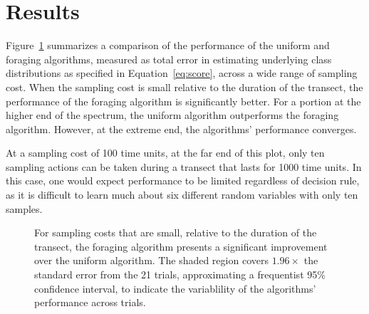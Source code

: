 \section{Results}
\label{sec:results}




% 

% 

Figure~\ref{fig:err} summarizes a comparison of the performance of the uniform and foraging algorithms, measured as total error in estimating underlying class distributions as specified in Equation~\ref{eq:score}, across a wide range of sampling cost.
When the sampling cost is small relative to the duration of the transect, the performance of the foraging algorithm is significantly better.  For a portion at the higher end of the spectrum, the uniform algorithm outperforms the foraging algorithm.  However, at the extreme end, the algorithms' performance converges.

At a sampling cost of 100 time units, at the far end of this plot, only ten sampling actions can be taken during a transect that lasts for 1000 time units.  In this case, one would expect performance to be limited regardless of decision rule, as it is difficult to learn much about six different random variables with only ten samples.


\begin{figure}[t!]%
	\centering
	\def\svgwidth{\columnwidth}
% 	
	
	\caption{For sampling costs that are small, relative to the duration of the transect, the foraging algorithm presents a significant improvement over the uniform algorithm.  The shaded region covers $1.96\times$ the standard error from the 21 trials, approximating a frequentist 95\% confidence interval, to indicate the variablility of the algorithms' performance across trials.}
	\label{fig:err}
\end{figure}


